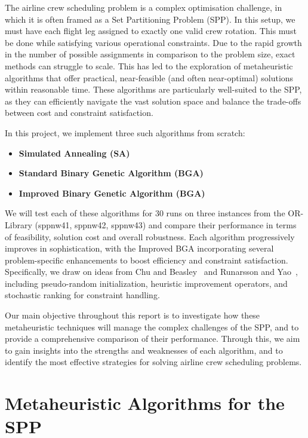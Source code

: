 \documentclass[12pt]{article}
\begin{document}
The airline crew scheduling problem is a complex optimisation challenge, in which it is often framed as a Set Partitioning Problem (SPP).
In this setup, we must have each flight leg assigned to exactly one valid crew rotation. This must be done while satisfying various operational constraints. 
Due to the rapid growth in the number of possible assignments in comparison to the problem size, exact methods can struggle to scale.
This has led to the exploration of metaheuristic algorithms that offer practical, near-feasible (and often near-optimal) solutions within reasonable time.
These algorithms are particularly well-suited to the SPP, as they can efficiently navigate the vast solution space and balance the trade-offs between cost and constraint satisfaction.

In this project, we implement three such algorithms from scratch:
\begin{itemize}
    \item \textbf{Simulated Annealing (SA)}
    \item \textbf{Standard Binary Genetic Algorithm (BGA)}
    \item \textbf{Improved Binary Genetic Algorithm (BGA)}
\end{itemize}

We will test each of these algorithms for 30 runs on three instances from the OR-Library (sppnw41, sppnw42, sppnw43) and compare their performance in terms of feasibility, solution cost and overall robustness.
Each algorithm progressively improves in sophistication, with the Improved BGA incorporating several problem-specific enhancements to boost efficiency and constraint satisfaction. 
Specifically, we draw on ideas from Chu and Beasley~\cite{ChuAndBeasley1998} and Runarsson and Yao~\cite{RunarssonYao2000}, including pseudo-random initialization, heuristic improvement operators, and stochastic ranking for constraint handling.

Our main objective throughout this report is to investigate how these metaheuristic techniques will manage the complex challenges of the SPP, and to provide a comprehensive comparison of their performance.
Through this, we aim to gain insights into the strengths and weaknesses of each algorithm, and to identify the most effective strategies for solving airline crew scheduling problems.

\section{Metaheuristic Algorithms for the SPP}
\end{document}
